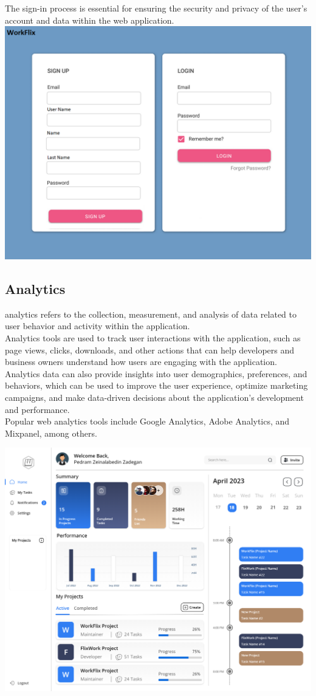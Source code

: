 The sign-in process is essential for ensuring the security and privacy of the user's account and data within the web application.\\
\includegraphics[width=\columnwidth]{WA-workflix-HW1/images/SignInLogIn.jpg}



\subsection{Analytics}

 analytics refers to the collection, measurement, and analysis of data related to user behavior and activity within the application.\\
 Analytics tools are used to track user interactions with the application, such as page views, clicks, downloads, and other actions that can help developers and business owners understand how users are engaging with the application.\\
 Analytics data can also provide insights into user demographics, preferences, and behaviors, which can be used to improve the user experience, optimize marketing campaigns, and make data-driven decisions about the application's development and performance.\\
 Popular web analytics tools include Google Analytics, Adobe Analytics, and Mixpanel, among others.

\includegraphics[width=\columnwidth]{WA-workflix-HW1/images/Analytics.png}

